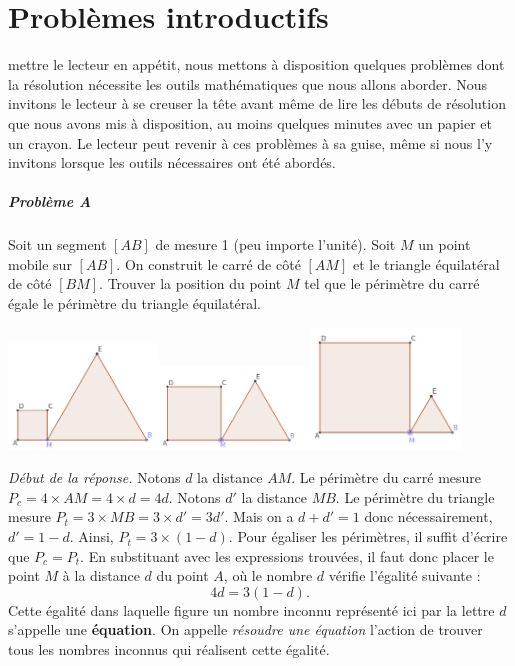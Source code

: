 
\chapter{Problèmes introductifs}

	 mettre le lecteur en appétit, nous mettons à disposition quelques problèmes dont la résolution nécessite les outils mathématiques que nous allons aborder. Nous invitons le lecteur à se creuser la tête avant même de lire les débuts de résolution que nous avons mis à disposition, au moins quelques minutes avec un papier et un crayon. Le lecteur peut revenir à ces problèmes à sa guise, même si nous l'y invitons lorsque les outils nécessaires ont été abordés.

	\paragraph{Problème A} Soit un segment $[AB]$ de mesure 1 (peu importe l'unité). Soit $M$ un point mobile sur $[AB]$. On construit le carré de côté $[AM]$ et le triangle équilatéral de côté $[BM]$.
	Trouver la position du point $M$ tel que le périmètre du carré égale le périmètre du triangle équilatéral.

	\includegraphics[width=0.3\textwidth]{image/calcul/pbtricar1.png}\includegraphics[width=0.3\textwidth]{image/calcul/pbtricar2.png}\includegraphics[width=0.3\textwidth]{image/calcul/pbtricar3.png}

	\emph{Début de la réponse.}
	Notons $d$ la distance $AM$. Le périmètre du carré mesure $P_c=4\times AM=4\times d = 4d$. 
	Notons $d'$ la distance $MB$. Le périmètre du triangle mesure $P_t=3\times MB = 3\times d'=3d'$. Mais on a $d+d'=1$ donc nécessairement, $d'=1-d$. Ainsi, $P_t=3\times(1-d)$. Pour égaliser les périmètres, il suffit d'écrire que $P_c=P_t$. En substituant avec les expressions trouvées, il faut donc placer le point $M$ à la distance $d$ du point $A$, où le nombre $d$ vérifie l'égalité suivante :
	\begin{equation}
		4d=3(1-d).
	\end{equation}
	Cette égalité dans laquelle figure un nombre inconnu représenté ici par la lettre $d$ s'appelle une {\bfseries équation}. On appelle \emph{résoudre une équation} l'action de trouver tous les nombres inconnus qui réalisent cette égalité.


